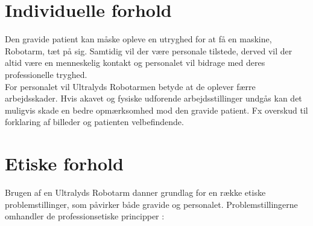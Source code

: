 \section{Individuelle forhold}
Den gravide patient kan måske opleve en utryghed for at få en maskine, Robotarm, tæt på sig. Samtidig vil der være personale tilstede, derved vil der altid være en menneskelig kontakt og personalet vil bidrage med deres professionelle tryghed.  \\
For personalet vil Ultralyds Robotarmen betyde at de oplever færre arbejdsskader. Hvis akavet og fysiske udforende arbejdsstillinger undgås kan det muligvis skade en bedre opmærksomhed mod den gravide patient. Fx overskud til forklaring af billeder og patienten velbefindende.  

\section{Etiske forhold}
Brugen af en Ultralyds Robotarm danner grundlag for en række etiske problemstillinger, som påvirker både gravide og personalet. 
Problemstillingerne omhandler de professionsetiske principper \cite{Husted}: 
